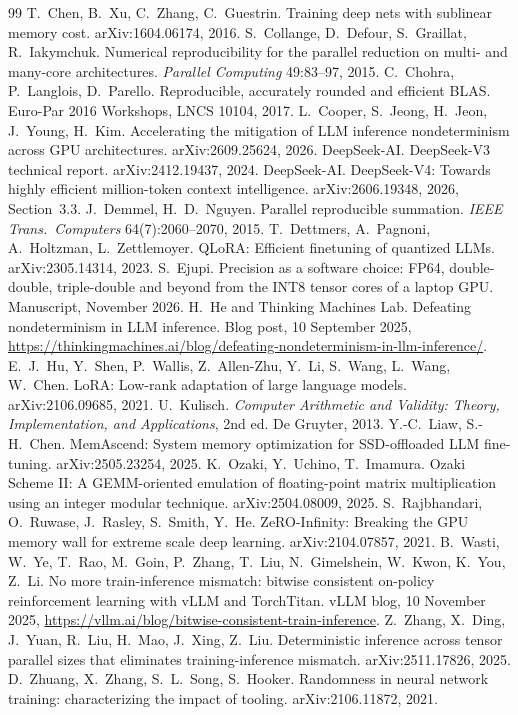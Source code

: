 \documentclass[11pt]{article}
\begin{document}
\begin{thebibliography}{99}\small
{} T.~Chen, B.~Xu, C.~Zhang, C.~Guestrin. Training deep nets with sublinear memory cost. arXiv:1604.06174, 2016.
 S.~Collange, D.~Defour, S.~Graillat, R.~Iakymchuk. Numerical reproducibility for the parallel reduction on
multi- and many-core architectures. \emph{Parallel Computing} 49:83--97, 2015.
 C.~Chohra, P.~Langlois, D.~Parello. Reproducible, accurately rounded and efficient BLAS. Euro-Par 2016
Workshops, LNCS 10104, 2017.
 L.~Cooper, S.~Jeong, H.~Jeon, J.~Young, H.~Kim. Accelerating the mitigation of LLM inference
nondeterminism across GPU architectures. arXiv:2609.25624, 2026.
 DeepSeek-AI. DeepSeek-V3 technical report. arXiv:2412.19437, 2024.
 DeepSeek-AI. DeepSeek-V4: Towards highly efficient million-token context intelligence. arXiv:2606.19348, 2026,
Section~3.3.
 J.~Demmel, H.~D.~Nguyen. Parallel reproducible summation. \emph{IEEE Trans.\ Computers}
64(7):2060--2070, 2015.
 T.~Dettmers, A.~Pagnoni, A.~Holtzman, L.~Zettlemoyer. QLoRA: Efficient finetuning of quantized LLMs.
arXiv:2305.14314, 2023.
 S.~Ejupi. Precision as a software choice: FP64, double-double, triple-double and beyond from the INT8
tensor cores of a laptop GPU. Manuscript, November 2026.
 H.~He and Thinking Machines Lab. Defeating nondeterminism in LLM inference. Blog post, 10 September 2025,
\url{https://thinkingmachines.ai/blog/defeating-nondeterminism-in-llm-inference/}.
 E.~J.~Hu, Y.~Shen, P.~Wallis, Z.~Allen-Zhu, Y.~Li, S.~Wang, L.~Wang, W.~Chen. LoRA: Low-rank adaptation of
large language models. arXiv:2106.09685, 2021.
 U.~Kulisch. \emph{Computer Arithmetic and Validity: Theory, Implementation, and Applications}, 2nd ed.
De Gruyter, 2013.
 Y.-C.~Liaw, S.-H.~Chen. MemAscend: System memory optimization for SSD-offloaded LLM fine-tuning.
arXiv:2505.23254, 2025.
 K.~Ozaki, Y.~Uchino, T.~Imamura. Ozaki Scheme II: A GEMM-oriented emulation of floating-point matrix
multiplication using an integer modular technique. arXiv:2504.08009, 2025.
 S.~Rajbhandari, O.~Ruwase, J.~Rasley, S.~Smith, Y.~He. ZeRO-Infinity: Breaking the GPU memory wall for
extreme scale deep learning. arXiv:2104.07857, 2021.
 B.~Wasti, W.~Ye, T.~Rao, M.~Goin, P.~Zhang, T.~Liu, N.~Gimelshein, W.~Kwon, K.~You, Z.~Li. No more
train-inference mismatch: bitwise consistent on-policy reinforcement learning with vLLM and TorchTitan. vLLM blog,
10 November 2025, \url{https://vllm.ai/blog/bitwise-consistent-train-inference}.
 Z.~Zhang, X.~Ding, J.~Yuan, R.~Liu, H.~Mao, J.~Xing, Z.~Liu. Deterministic inference across tensor parallel
sizes that eliminates training-inference mismatch. arXiv:2511.17826, 2025.
 D.~Zhuang, X.~Zhang, S.~L.~Song, S.~Hooker. Randomness in neural network training: characterizing the
impact of tooling. arXiv:2106.11872, 2021.
\end{thebibliography}
\end{document}
